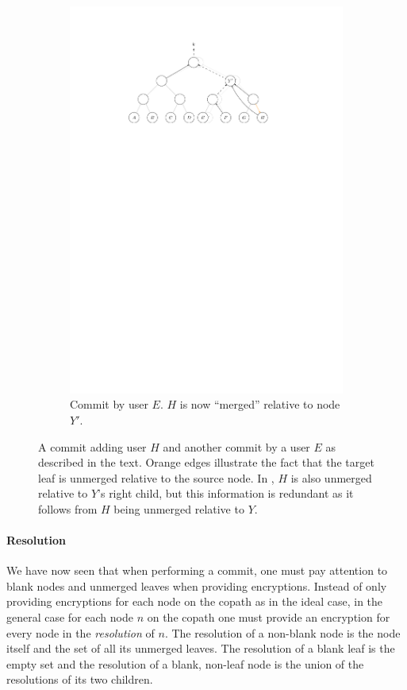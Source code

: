 \begin{figure}
\begin{subfigure}[b]{\textwidth}
		\includegraphics[width=\textwidth]{figures/treekem-add-2}
		\caption{Commit by user $E$. $H$ is now ``merged'' relative to node $Y'$.}
	\end{subfigure}
	\caption{A commit adding user $H$ and another commit by a user $E$ as described in the text. Orange edges illustrate the fact that the target leaf is unmerged relative to the source node. In , $H$ is also unmerged relative to $Y$'s right child, but this information is redundant as it follows from $H$ being unmerged relative to $Y$.}
	\label{fig:treekem-add}
\end{figure}

\paragraph{Resolution} We have now seen that when performing a commit, one must pay attention to blank nodes and unmerged leaves when providing encryptions. Instead of only providing encryptions for each node on the copath as in the ideal case, in the general case for each node $n$ on the copath one must provide an encryption for every node in the \emph{resolution} of $n$. The resolution of a non-blank node is the node itself and the set of all its unmerged leaves. The resolution of a blank leaf is the empty set and the resolution of a blank, non-leaf node is the union of the resolutions of its two children.

